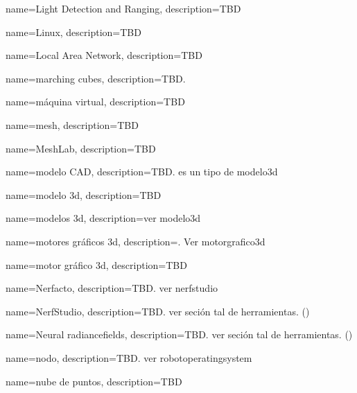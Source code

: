 {
    name={Light Detection and Ranging},
    description={TBD}
}

{
    name={Linux},
    description={TBD}
}

{
    name={Local Area Network},
    description={TBD}
}


{
    name={marching cubes},
    description={TBD. \cite{lorensen-cline:marchingcubes}}
}

{
    name={máquina virtual},
    description={TBD}
}

{
    name={mesh},
    description={TBD}
}

{
    name={MeshLab},
    description={TBD}
}

{
    name={modelo CAD},
    description={TBD. es un tipo de \gls{modelo3d}}
}

{
    name={modelo \acrshort{3d}},
    description={TBD}
}

{
    name={modelos \acrshort{3d}},
    description={ver \gls{modelo3d}}
}

{
    name={motores gráficos \acrshort{3d}},
    description={. Ver \gls{motorgrafico3d}}
}

{
    name={motor gráfico \acrshort{3d}},
    description={TBD}
}


{
    name={Nerfacto},
    description={TBD. ver \gls{nerfstudio}}
}

{
    name={NerfStudio},
    description={TBD. ver seción tal de herramientas. (\cite{nerfstudio})}
}

{
    name={Neural \glspl{radiancefield}},
    description={TBD. ver seción tal de herramientas. (\cite{mildenhall2020nerf})}
}

{
    name={nodo},
    description={TBD. ver \gls{robotoperatingsystem}}
}

{
    name={nube de puntos},
    description={TBD}
}

